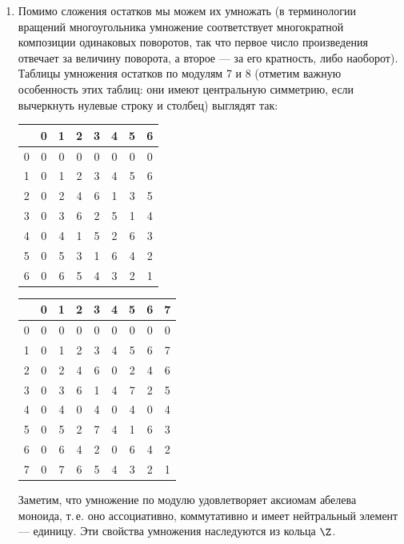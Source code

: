 \begin{enumerate}
\item Помимо сложения остатков мы можем их умножать (в терминологии вращений многоугольника умножение соответствует многократной композиции одинаковых поворотов, так что первое число произведения отвечает за величину поворота, а второе --- за его кратность, либо наоборот). Таблицы умножения остатков по модулям 7 и 8 (отметим важную особенность этих таблиц: они имеют центральную симметрию, если вычеркнуть нулевые строку и столбец) выглядят так:
\begin{center}
\begin{tabular}{c||c||c|c|c|c|c|c|}
  & 0 & 1 & 2 & 3 & 4 & 5 & 6 \\ \hline\hline
0 & 0 & 0 & 0 & 0 & 0 & 0 & 0 \\ \hline\hline
1 & 0 & 1 & 2 & 3 & 4 & 5 & 6 \\ \hline
2 & 0 & 2 & 4 & 6 & 1 & 3 & 5 \\ \hline
3 & 0 & 3 & 6 & 2 & 5 & 1 & 4 \\ \hline
4 & 0 & 4 & 1 & 5 & 2 & 6 & 3 \\ \hline
5 & 0 & 5 & 3 & 1 & 6 & 4 & 2 \\ \hline
6 & 0 & 6 & 5 & 4 & 3 & 2 & 1 \\ \hline
\end{tabular}
\qquad
\begin{tabular}{c||c||c|c|c|c|c|c|c|}
  & 0 & 1 & 2 & 3 & 4 & 5 & 6 & 7 \\ \hline\hline
0 & 0 & 0 & 0 & 0 & 0 & 0 & 0 & 0 \\ \hline\hline
1 & 0 & 1 & 2 & 3 & 4 & 5 & 6 & 7 \\ \hline
2 & 0 & 2 & 4 & 6 & 0 & 2 & 4 & 6 \\ \hline
3 & 0 & 3 & 6 & 1 & 4 & 7 & 2 & 5 \\ \hline
4 & 0 & 4 & 0 & 4 & 0 & 4 & 0 & 4 \\ \hline
5 & 0 & 5 & 2 & 7 & 4 & 1 & 6 & 3 \\ \hline
6 & 0 & 6 & 4 & 2 & 0 & 6 & 4 & 2 \\ \hline
7 & 0 & 7 & 6 & 5 & 4 & 3 & 2 & 1 \\ \hline
\end{tabular}
\end{center}

Заметим, что умножение по модулю удовлетворяет аксиомам абелева моноида, т.\,е. оно ассоциативно, коммутативно и имеет нейтральный элемент --- единицу. Эти свойства умножения наследуются из кольца $\Z$.


\end{enumerate}
